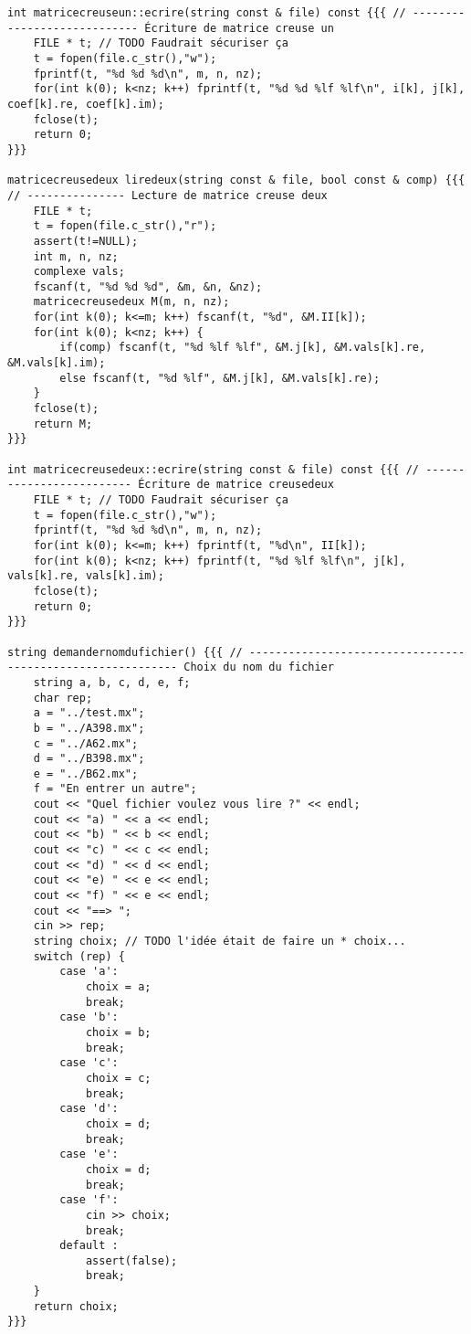 \documentclass[a4paper]{article}
\begin{document}
\begin{verbatim}
int matricecreuseun::ecrire(string const & file) const {{{ // ---------------------------- Écriture de matrice creuse un
    FILE * t; // TODO Faudrait sécuriser ça
    t = fopen(file.c_str(),"w");
    fprintf(t, "%d %d %d\n", m, n, nz);
    for(int k(0); k<nz; k++) fprintf(t, "%d %d %lf %lf\n", i[k], j[k], coef[k].re, coef[k].im);
    fclose(t);
    return 0;
}}}

matricecreusedeux liredeux(string const & file, bool const & comp) {{{ // --------------- Lecture de matrice creuse deux
    FILE * t;
    t = fopen(file.c_str(),"r");
    assert(t!=NULL);
    int m, n, nz;
    complexe vals;
    fscanf(t, "%d %d %d", &m, &n, &nz);
    matricecreusedeux M(m, n, nz);
    for(int k(0); k<=m; k++) fscanf(t, "%d", &M.II[k]);
    for(int k(0); k<nz; k++) {
        if(comp) fscanf(t, "%d %lf %lf", &M.j[k], &M.vals[k].re, &M.vals[k].im);
        else fscanf(t, "%d %lf", &M.j[k], &M.vals[k].re);
    }
    fclose(t);
    return M;
}}}

int matricecreusedeux::ecrire(string const & file) const {{{ // ------------------------- Écriture de matrice creusedeux
    FILE * t; // TODO Faudrait sécuriser ça
    t = fopen(file.c_str(),"w");
    fprintf(t, "%d %d %d\n", m, n, nz);
    for(int k(0); k<=m; k++) fprintf(t, "%d\n", II[k]);
    for(int k(0); k<nz; k++) fprintf(t, "%d %lf %lf\n", j[k], vals[k].re, vals[k].im);
    fclose(t);
    return 0;
}}}

string demandernomdufichier() {{{ // ----------------------------------------------------------- Choix du nom du fichier
    string a, b, c, d, e, f;
    char rep;
    a = "../test.mx";
    b = "../A398.mx";
    c = "../A62.mx";
    d = "../B398.mx";
    e = "../B62.mx";
    f = "En entrer un autre";
    cout << "Quel fichier voulez vous lire ?" << endl;
    cout << "a) " << a << endl;
    cout << "b) " << b << endl;
    cout << "c) " << c << endl;
    cout << "d) " << d << endl;
    cout << "e) " << e << endl;
    cout << "f) " << e << endl;
    cout << "==> ";
    cin >> rep;
    string choix; // TODO l'idée était de faire un * choix...
    switch (rep) {
        case 'a':
            choix = a;
            break;
        case 'b':
            choix = b;
            break;
        case 'c':
            choix = c;
            break;
        case 'd':
            choix = d;
            break;
        case 'e':
            choix = d;
            break;
        case 'f':
            cin >> choix;
            break;
        default :
            assert(false);
            break;
    }
    return choix;
}}}


\end{verbatim}
\end{document}
